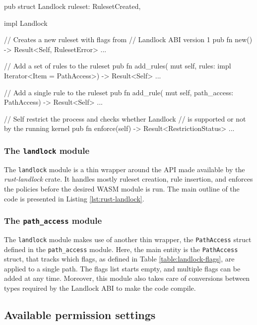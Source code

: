 \begin{code}[language=Rust, caption=The outline of the \texttt{landlock} module., label=lst:rust-landlock]
pub struct Landlock {
  ruleset: RulesetCreated,
}

impl Landlock {
  // Creates a new ruleset with flags from
  // Landlock ABI version 1
  pub fn new() -> Result<Self, RulesetError> {...}

  // Add a set of rules to the ruleset
  pub fn add_rules(
    mut self,
    rules: impl Iterator<Item = PathAccess>)
    -> Result<Self>
  {...}

  // Add a single rule to the ruleset
  pub fn add_rule(
    mut self,
    path_access: PathAccess) -> Result<Self>
  {...}

  // Self restrict the process and checks whether Landlock
  // is supported or not by the running kernel
  pub fn enforce(self) -> Result<RestrictionStatus>
  {...}
}
\end{code}

\subsubsection{The \texttt{landlock} module}

The \texttt{landlock} module is a thin wrapper around the API made available by the \textit{rust-landlock} crate.
It handles mostly ruleset creation, rule insertion, and enforces the policies before the desired WASM module is run.
The main outline of the code is presented in Listing \ref{lst:rust-landlock}.

\subsubsection{The \texttt{path\_access} module}

The \texttt{landlock} module makes use of another thin wrapper, the \texttt{PathAccess} struct defined
in the \texttt{path\_access} module.
Here, the main entity is the \texttt{PathAccess} struct, that tracks which flags, as defined in Table \ref{table:landlock-flags},
are applied to a single path. The flags list starts empty, and multiple flags can be added at any time.
Moreover, this module also takes care of conversions between types required by the Landlock ABI to make the code compile.

\subsection{Available permission settings}

